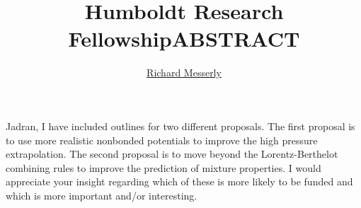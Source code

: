 \documentclass[11pt,a4paper]{article}
\begin{document}
	\thispagestyle{empty}
	\title{\Large \textbf{Humboldt Research Fellowship}}
	\author[1]{\large {\underline{Richard Messerly}}}%
	
	
	\date{} %
	\maketitle\thispagestyle{empty} %
	\begin{center}
		\title{\textbf{ABSTRACT}}\centering{}
	\end{center}
	\justify

Jadran, I have included outlines for two different proposals. The first proposal is to use more realistic nonbonded potentials to improve the high pressure extrapolation. The second proposal is to move beyond the Lorentz-Berthelot combining rules to improve the prediction of mixture properties. I would appreciate your insight regarding which of these is more likely to be funded and which is more important and/or interesting.
\end{document}
